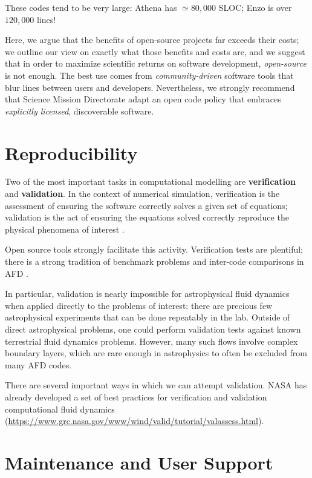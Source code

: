 \documentclass[12pt, preprint]{aastex}
\begin{document}
These codes tend to be very large: Athena has $\simeq 80,000$ SLOC; Enzo is over $120,000$ lines! 

Here, we argue that the benefits of open-source projects far exceeds their costs; we outline our view on exactly what those benefits and costs are, and we suggest that in order to maximize scientific returns on software development, \emph{open-source} is not enough. The best use comes from \emph{community-driven} software tools that blur lines between users and developers. Nevertheless, we strongly recommend that Science Mission Directorate adapt an open code policy that embraces \emph{explicitly licensed}, discoverable software. 

\section{Reproducibility}
\label{sec:repro}

Two of the most important tasks in computational modelling are \textbf{verification} and \textbf{validation}. In the context of numerical simulation, verification is the assessment of ensuring the software correctly solves a given set of equations; validation is the act of ensuring the equations solved correctly reproduce the physical phenomena of interest \citep{2002PrAeS..38..209O}. 

Open source tools strongly facilitate this activity. Verification tests are plentiful; there is a strong tradition of benchmark problems and inter-code comparisons in AFD \citep[e.g.][among many others]{2001JGR...106.3715B,2014GeoJI.197..119M,2014ApJS..210...14K,2016MNRAS.455.4274L}.

In particular, validation is nearly impossible for astrophysical fluid dynamics when applied directly to the problems of interest: there are precious few astrophysical experiments that can be done repeatably in the lab. Outside of direct astrophysical problems, one could perform validation tests against known terrestrial fluid dynamics problems.  However, many such flows involve complex boundary layers, which are rare enough in astrophysics to often be excluded from many AFD codes. 

There are several important ways in which we can attempt validation. NASA has already developed a set of best practices for verification and validation computational fluid dynamics (\url{https://www.grc.nasa.gov/www/wind/valid/tutorial/valassess.html}). 

\section{Maintenance and User Support}
\label{sec:support}
\end{document}
